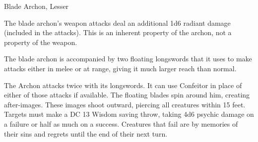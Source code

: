 \begin{DndMonster}{Blade Archon, Lesser}
	\DndMonsterBasics[armor-class={15 (scale mail)}, hit-points={60}, speed={30 ft., fly 50 ft. (hover)}]
	\DndMonsterDetails[skills={Athletics +6}, damage-resistances={radiant}, damage-immunities={poison}, senses={darkvision 60 ft., passive Perception 19}, languages={celestial}, challenge={3:3}]

	 The blade archon's weapon attacks deal an additional 1d6 radiant damage (included in the attacks). This is an inherent property of the archon, not a property of the weapon.
	
	 The blade archon is accompanied by two floating longswords that it uses to make attacks either in melee or at range, giving it much larger reach than normal.
	
	 The Archon attacks twice with its longswords. It can use Confeitor in place of either of those attacks if available.
	\DndMonsterAttack[
		name=Floating Longsword,
		distance=both,
		type=weapon,
		mod=+6,
		reach=20 ft.,
		dmg=\DndDice{1d10+4},
		dmg-type=slashing,
		plus-dmg=\DndDice{1d6},
		plus-dmg-type=radiant
	]
	 The floating blades spin around him, creating after-images. These images shoot outward, piercing all creatures within 15 feet. Targets must make a DC 13 Wisdom saving throw, taking 4d6 psychic damage on a failure or half as much on a success. Creatures that fail are  by memories of their sins and regrets until the end of their next turn.
\end{DndMonster}


